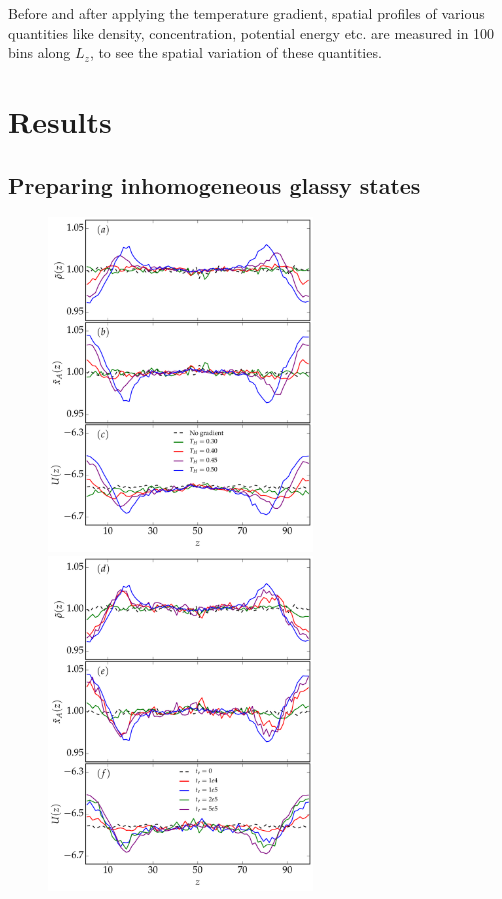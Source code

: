  Before and after applying the temperature gradient, spatial profiles of various quantities like density, concentration, potential energy etc. are measured in 100 bins along $L_z$, to see the spatial variation of these quantities.

\section{Results}

\subsection{Preparing inhomogeneous glassy states}

\begin{figure}[hbt!]
\centering
\includegraphics[width=7cm]{./figs/thermalResponse.pdf}
\includegraphics[width=7cm]{./figs/thermalResponse_exp.pdf}

\end{figure}
